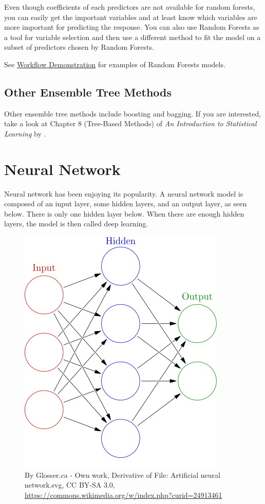 \documentclass[
]{book}
\begin{document}
Even though coefficients of each predictors are not available for random forests, you can easily get the important variables and at least know which variables are more important for predicting the response. You can also use Random Forests as a tool for variable selection and then use a different method to fit the model on a subset of predictors chosen by Random Forests.

See \protect\hyperlink{workflow-demonstration}{Workflow Demonstration} for examples of Random Forests models.

\hypertarget{other-ensemble-tree-methods}{%
\subsection{Other Ensemble Tree Methods}\label{other-ensemble-tree-methods}}

Other ensemble tree methods include boosting and bagging. If you are interested, take a look at Chapter 8 (Tree-Based Methods) of \emph{An Introduction to Statistical Learning} by \citet{james2013introduction}.

\hypertarget{neural-network}{%
\section{Neural Network}\label{neural-network}}

Neural network has been enjoying its popularity. A neural network model is composed of an input layer, some hidden layers, and an output layer, as seen below. There is only one hidden layer below. When there are enough hidden layers, the model is then called deep learning.

\begin{figure}
\centering
\includegraphics{images/Colored_neural_network.svg.png}
\caption{By Glosser.ca - Own work, Derivative of File: Artificial neural network.svg, CC BY-SA 3.0, \url{https://commons.wikimedia.org/w/index.php?curid=24913461}}
\end{figure}
\end{document}
